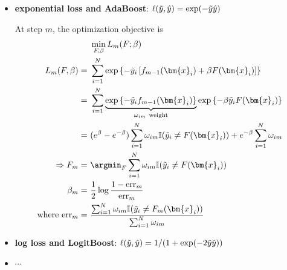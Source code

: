 \begin{itemize}
\begin{itemize}
        \item \textbf{exponential loss and AdaBoost}: $\ell(\Tilde{y},\hat{y})=\exp(-\Tilde{y}\hat{y})$
        \begin{example}[AdaBoost]
            At step $m$, the optimization objective is 
            \begin{align}
                &~\min_{F,\beta} L_m(F;\beta) \\
                L_m(F,\beta) 
                =&~ \sum_{i=1}^N\exp\left\{
                    -\Tilde{y}_i\left[
                        f_{m-1}(\bm{x}_i) + \beta F(\bm{x}_i)
                    \right]
                \right\} \\
                =&~ \sum_{i=1}^N
                \underbrace{\exp\left\{-\Tilde{y}_if_{m-1}(\bm{x}_i)\right\}}_{\omega_{im}~\text{weight}}
                \exp\left\{
                    -\beta\Tilde{y}_i F(\bm{x}_i)
                \right\} \\
                {=}&~ (e^\beta - e^{-\beta})\sum_{i=1}^N\omega_{im}\mathbb{I}(\Tilde{y}_i\neq F(\bm{x}_i)) + e^{-\beta}\sum_{i=1}^N\omega_{im} \\
                \Rightarrow
                F_m =&~ \argmin_{F}\sum_{i=1}^N\omega_{im}\mathbb{I}(\Tilde{y}_i\neq F(\bm{x}_i))\\
                \beta_m =&~ \frac{1}{2}\log\frac{1-\text{err}_m}{\text{err}_m} \\
                \text{where err}_m =&~ \frac{\sum_{i=1}^N\omega_{im}\mathbb{I}(\Tilde{y}_i\neq F_m(\bm{x}_i))}{\sum_{i=1}^N\omega_{im}}
            \end{align}
        \end{example}
        \bigskip
        \item \textbf{log loss and LogitBoost}: $\ell(\Tilde{y},\hat{y})=1/(1+\exp(-2\Tilde{y}\hat{y}))$
        \item $\cdots$
    \end{itemize}
\end{itemize}



